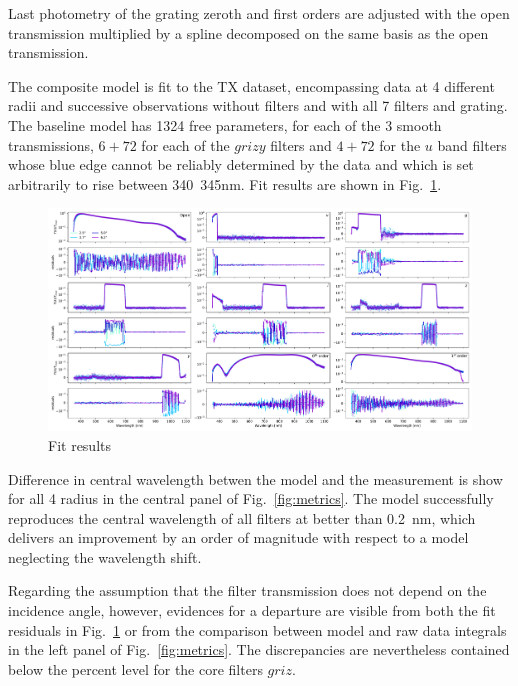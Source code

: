 Last photometry of the grating zeroth and first orders are adjusted
with the open transmission multiplied by a spline decomposed on
the same basis as the open transmission.

The composite model is fit to the TX dataset, encompassing data at 4
different radii and successive observations without filters and with
all 7 filters and grating. The baseline model has 1324 free
parameters,  for each of the 3 smooth transmissions,
$6+72$ for each of the $grizy$ filters and $4+72$ for the $u$ band
filters whose blue edge cannot be reliably determined by the data and
which is set arbitrarily to rise between \SI{340}{345}{nm}. Fit
results are shown in Fig.~\ref{fig:lambdathetafitresults}.

\begin{figure}
  \centering
  \includegraphics[width=1\linewidth]{./fig/lambdathetafitresults.pdf}
  \caption{Fit results}
  \label{fig:lambdathetafitresults}
\end{figure}

Difference in central wavelength betwen the model and the measurement
is show for all 4 radius in the central panel of
Fig.~\ref{fig:metrics}. The model successfully reproduces the central
wavelength of all filters at better than \SI{0.2}{nm}, which delivers
an improvement by an order of magnitude with respect to a model
neglecting the wavelength shift.

Regarding the assumption that the filter transmission does not depend
on the incidence angle, however, evidences for a departure are visible
from both the fit residuals in Fig.~\ref{fig:lambdathetafitresults} or
from the comparison between model and raw data integrals in the left
panel of Fig.~\ref{fig:metrics}. The discrepancies are nevertheless
contained below the percent level for the core filters $griz$.

